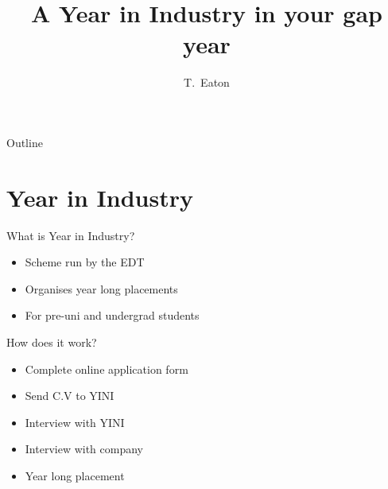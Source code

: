 \documentclass{beamer}
\title[Gap year internship] %
{A Year in Industry in your gap year}
\author[Author] %
{T.~Eaton\inst{1}}
\institute[Company] %
{
  \inst{1}%
  Aerospace Engineering department\\
  LiveLink Technology
}
\date[KES Presentation] %
{\formatdate{13}{11}{2017}}
\begin{document}

\begin{frame}
  \titlepage
\end{frame}

\begin{frame}{Outline}
  \tableofcontents
\end{frame}




\section{Year in Industry}


\begin{frame}{What is Year in Industry?}

  \begin{itemize}
  \item
	  Scheme run by the EDT
  \item
	  Organises year long placements
  \item
	  For pre-uni and undergrad students
  \end{itemize}
\end{frame}

\begin{frame}{How does it work?}
	\begin{itemize}
		\item
			Complete online application form
		\item
			Send C.V to YINI
		\item 
			Interview with YINI
		\item
			Interview with company
		\item
			Year long placement
 	\end{itemize}
\end{frame}
\end{document}
